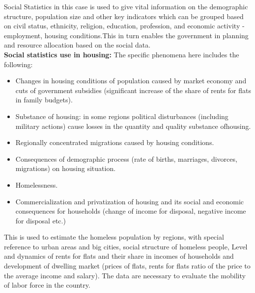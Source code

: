 \documentclass[11pt]{article}
\begin{document}
\noindent Social Statistics in this case is used to give vital information on the demographic structure, population size and other key indicators which can be grouped based on civil status, ethnicity, religion,
education, profession, and economic activity - employment, housing conditions.This in turn enables the government in planning and resource allocation based on the social data.\\

\noindent\textbf{Social statistics use in housing:} The specific phenomena here includes the following:
\begin{itemize}
\item Changes in housing conditions of population caused by market economy and cuts of government subsidies (significant increase of the share of rents for flats in family budgets).
\item Substance of housing: in some regions political disturbances (including military actions) cause losses in the quantity and quality substance ofhousing.
\item Regionally concentrated migrations caused by housing conditions.
\item Consequences of demographic process (rate of births, marriages, divorces, migrations) on housing situation.
\item Homelessness.
\item Commercialization and privatization of housing and its social and economic consequences for households (change of income for disposal, negative income for disposal etc.)
\end{itemize}  
\noindent This is used to estimate the homeless population by regions, with special reference to urban
areas and big cities, social structure of homeless people, Level and dynamics of rents for flats and their share in incomes of households and development of dwelling market (prices of flats, rents for flats ratio of the price to the average income and salary). The data are necessary to evaluate the mobility
of labor force in the country. \\
\end{document}
